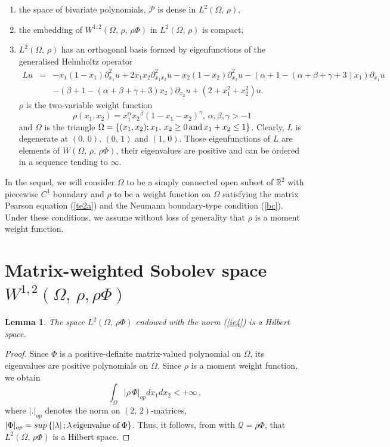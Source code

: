 \documentclass[11pt]{article}
\newtheorem{lemma}[theorem]{Lemma}
\begin{document}
	\begin{enumerate}
		\item the space of bivariate polynomials, $\mathcal{P}$ is dense in $L^2(\Omega,\, \rho)$,
		\item the embedding of $W^{1,2}\left(\Omega,\, \rho,\,\rho\Phi\right)$  in  $L^2(\Omega,\, \rho)$ is compact,
		\item 	$L^2(\Omega,\,\rho)$ has an orthogonal basis formed by   eigenfunctions of the generalised Helmholtz operator
		\begin{eqnarray*}
			Lu&=&-x_1(1-x_1)\partial_{x_1}^2u+2x_1x_2\partial_{x_1x_2}^2u-x_2(1-x_2)\partial_{x_2}^2u-(\alpha+1-(\alpha+\beta+\gamma+3)x_1)\partial_{x_1}u\\
			&&-(\beta+1-(\alpha+\beta+\gamma+3)x_2)\partial_{x_2}u+(2+x_1^2+x_2^2)u.
		\end{eqnarray*}  $\rho$ is the two-variable  weight function $$\rho(x_1,x_2)=x_1^{\alpha} {x_2}^{\beta}\left(1-x_1-x_2\right)^{\gamma},\,\alpha,\beta,\gamma>-1$$ and $\Omega$ is the triangle $\Omega=\left\{(x_1,x_2);x_1,\,x_2\geq 0\,{\rm and}\, x_1+x_2\leq 1\right\}$. Clearly, $L$ is degenerate at $(0,\,0),\,(0,\,1)$ and $(1,\,0)$. Those  eigenfunctions of $L$  are elements of $W(\Omega,\,\rho,\,\rho\Phi)$, their eigenvalues are positive and can be ordered in a sequence tending to $\infty$.
	\end{enumerate} 
	In the sequel, we will consider $\Omega$ to be a simply connected open subset of $\mathbb{R}^2$ with piecewise $C^1$ boundary and $\rho$ to be a weight function on $\Omega$ satisfying the matrix Pearson equation (\ref{te2a}) and the Neumann boundary-type condition (\ref{bc}). Under these conditions, we assume without loss of generality that $\rho$ is a moment weight function.
	
	\section{Matrix-weighted Sobolev space $W^{1,2}(\Omega,\, \rho,\rho \Phi)$}
	
	
	
	\begin{lemma} The space $L^2(\Omega,\,\rho \Phi)$ endowed with the norm (\ref{ie4}) is a Hilbert space.
	\end{lemma}
	
	\begin{proof}
		Since $\Phi$ is a positive-definite matrix-valued polynomial on $\Omega$, its eigenvalues are positive polynomials on $\Omega$. Since $\rho$ is a moment {weight} function, we obtain
		\begin{equation*}
			\int_{\Omega}\left|\rho\,\Phi\right|_{op}dx_1dx_2<+\infty\,,
		\end{equation*}
		where $\lvert . \rvert_{op}$ denotes the norm on $(2,\,2)$-matrices,
		$|\Phi|_{op}=sup\left\{\left |\lambda\right|; \lambda\, {\rm eigenvalue\; of}\, \Phi\right\}$. Thus,  it follows, from  \cite[Theorem 4]{SW} with $\mathcal{Q}=\rho \Phi$, that  $L^2(\Omega,\,  \rho \Phi)$ is a Hilbert space.  
	\end{proof}
	
\end{document}
